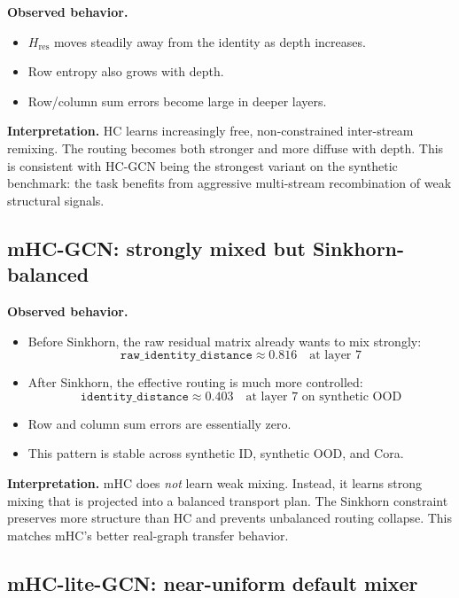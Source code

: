 \documentclass[11pt,a4paper]{article}
\begin{document}
\textbf{Observed behavior.}
\begin{itemize}[noitemsep]
  \item $H_{\mathrm{res}}$ moves steadily away from the identity as depth increases.
  \item Row entropy also grows with depth.
  \item Row/column sum errors become large in deeper layers.
\end{itemize}

\textbf{Interpretation.}
HC learns increasingly free, non-constrained inter-stream remixing.
The routing becomes both stronger and more diffuse with depth.
This is consistent with HC-GCN being the strongest variant on the synthetic benchmark:
the task benefits from aggressive multi-stream recombination of weak structural signals.

\subsection{mHC-GCN: strongly mixed but Sinkhorn-balanced}

\textbf{Observed behavior.}
\begin{itemize}[noitemsep]
  \item Before Sinkhorn, the raw residual matrix already wants to mix strongly:
  \[
  \texttt{raw\_identity\_distance} \approx 0.816 \quad \text{at layer 7}
  \]
  \item After Sinkhorn, the effective routing is much more controlled:
  \[
  \texttt{identity\_distance} \approx 0.403 \quad \text{at layer 7 on synthetic OOD}
  \]
  \item Row and column sum errors are essentially zero.
  \item This pattern is stable across synthetic ID, synthetic OOD, and Cora.
\end{itemize}

\textbf{Interpretation.}
mHC does \emph{not} learn weak mixing.
Instead, it learns strong mixing that is projected into a balanced transport plan.
The Sinkhorn constraint preserves more structure than HC and prevents unbalanced routing collapse.
This matches mHC's better real-graph transfer behavior.

\subsection{mHC-lite-GCN: near-uniform default mixer}
\end{document}
